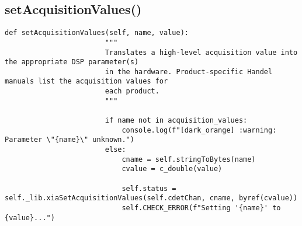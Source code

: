            \subsection{setAcquisitionValues()}
                \begin{lstlisting}[style=mypython, firstnumber=117, caption={[XMagix method setAcquisitionValues()]XMagix method setAcquisitionValues().}, label={lst:xmagix setAcquisitionValues}, gobble=16]
                    def setAcquisitionValues(self, name, value):
                        """
                        Translates a high-level acquisition value into the appropriate DSP parameter(s)
                        in the hardware. Product-specific Handel manuals list the acquisition values for
                        each product.
                        """

                        if name not in acquisition_values:
                            console.log(f"[dark_orange] :warning: Parameter \"{name}\" unknown.")
                        else:
                            cname = self.stringToBytes(name)
                            cvalue = c_double(value)

                            self.status = self._lib.xiaSetAcquisitionValues(self.cdetChan, cname, byref(cvalue))
                            self.CHECK_ERROR(f"Setting '{name}' to {value}...")
                \end{lstlisting}
            
